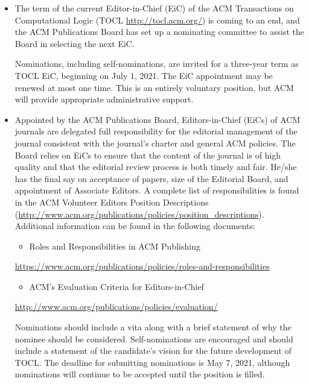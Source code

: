 \documentclass[prodmode,acmtecs]{acmsmall} %
\begin{document}
\begin{itemize}\item  The term of the current Editor-in-Chief (EiC) of the ACM Transactions on Computational Logic (TOCL \href{http://tocl.acm.org/}{http://tocl.acm.org/}) is coming to an end, and the ACM Publications Board has set up a nominating committee to assist the Board in selecting the next EiC. 
 
  Nominations, including self-nominations, are invited for a three-year term as TOCL EiC, beginning on July 1, 2021.  The EiC appointment may be renewed at most one time. This is an entirely voluntary position, but ACM will provide appropriate administrative support. 
 
\end{itemize}\begin{itemize}\item  Appointed by the ACM Publications Board, Editors-in-Chief (EiCs) of ACM journals are delegated full responsibility for the editorial management of the journal consistent with the journal's charter and general ACM policies. The Board relies on EiCs to ensure that the content of the journal is of high quality and that the editorial review process is both timely and fair. He/she has the final say on acceptance of papers, size of the Editorial Board, and appointment of Associate Editors. A complete list of responsibilities is found in the ACM Volunteer Editors Position Descriptions (\href{http://www.acm.org/publications/policies/position_descriptions}{http://www.acm.org/publications/policies/position\_descriptions}). Additional information can be found in the following documents: 
 
\begin{itemize}\item  Roles and Responsibilities in ACM Publishing 
\end{itemize} 
    \href{https://www.acm.org/publications/policies/roles-and-responsibilities}{https://www.acm.org/publications/policies/roles-and-responsibilities} 
 
\begin{itemize}\item  ACM's Evaluation Criteria for Editors-in-Chief
\end{itemize} 
    \href{http://www.acm.org/publications/policies/evaluation/}{http://www.acm.org/publications/policies/evaluation/} 
 
  Nominations should include a vita along with a brief statement of why the nominee should be considered. Self-nominations are encouraged and should include a statement of the candidate's vision for the future development of TOCL. The deadline for submitting nominations is May 7, 2021, although nominations will continue to be accepted until the position is filled.  
 

\end{itemize}
\end{document}
